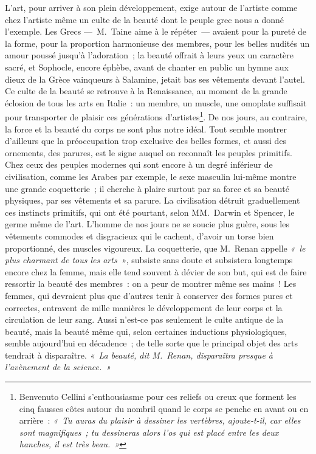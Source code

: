 \documentclass[french,twoside]{book} %
\begin{document}
L’art, pour arriver à son plein développement, exige autour de l’artiste comme chez l’artiste même un culte de la beauté dont le peuple grec nous a donné l’exemple. Les Grecs — M. Taine aime à le répéter — avaient pour la pureté de la forme, pour la proportion harmonieuse des membres, pour les belles nudités un amour poussé jusqu’à l’adoration ; la beauté offrait à leurs yeux un caractère sacré, et Sophocle, encore éphèbe, avant de chanter en public un hymne aux dieux de la Grèce vainqueurs à Salamine, jetait bas ses vêtements devant l’autel. Ce culte de la beauté se retrouve à la Renaissance, au moment de la grande éclosion de tous les arts en Italie : un membre, un muscle,  une omoplate suffisait pour transporter de plaisir ces générations d’artistes\footnote{Benvenuto Cellini s’enthousiasme pour ces reliefs ou creux que forment les cinq fausses côtes autour du nombril quand le corps se penche en avant ou en arrière : \emph{« Tu auras du plaisir à dessiner les vertèbres, ajoute-t-il, car elles sont magnifiques ; tu dessineras alors l’os qui est placé entre les deux hanches, il est très beau. »}}. De nos jours, au contraire, la force et la beauté du corps ne sont plus notre idéal. Tout semble montrer d’ailleurs que la préoccupation trop exclusive des belles formes, et aussi des ornements, des parures, est le signe auquel on reconnaît les peuples primitifs. Chez ceux des peuples modernes qui sont encore à un degré inférieur de civilisation, comme les Arabes par exemple, le sexe masculin lui-même montre une grande coquetterie ; il cherche à plaire surtout par sa force et sa beauté physiques, par ses vêtements et sa parure. La civilisation détruit graduellement ces instincts primitifs, qui ont été pourtant, selon MM. Darwin et Spencer, le germe même de l’art. L’homme de nos jours ne se soucie plus guère, sous les vêtements commodes et disgracieux qui le cachent, d’avoir un torse bien proportionné, des muscles vigoureux. La coquetterie, que M. Renan appelle \emph{« le plus charmant de tous les arts »}, subsiste sans doute et subsistera longtemps encore chez la femme, mais elle tend souvent à dévier de son but, qui est de faire ressortir la beauté des membres : on a peur de montrer même ses mains ! Les femmes, qui devraient plus que d’autres tenir à conserver des formes pures et correctes, entravent de mille manières le développement de leur corps et la circulation de leur sang. Aussi n’est-ce pas seulement le culte antique de la beauté, mais la  beauté même qui, selon certaines inductions physiologiques, semble aujourd’hui en décadence ; de telle sorte que le principal objet des arts tendrait à disparaître. \emph{« La beauté, dit M. Renan, disparaîtra presque à l’avènement de la science. »}\par
\end{document}
